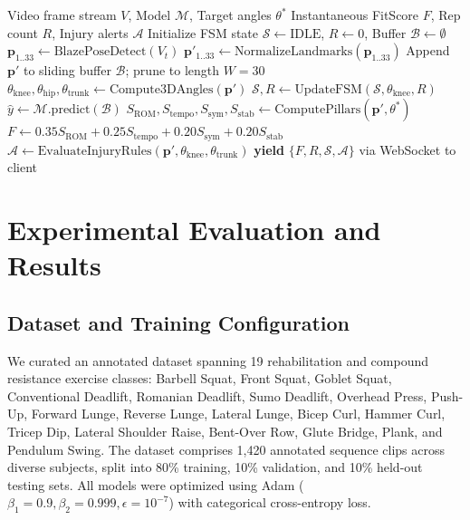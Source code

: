\documentclass[conference]{IEEEtran}
\begin{document}
\begin{algorithm}[!t]
\caption{Real-Time Biomechanical Evaluation and Scoring}
\label{alg:fitscore}
\begin{algorithmic}[1]
\REQUIRE Video frame stream $V$, Model $\mathcal{M}$, Target angles $\theta^*$
\ENSURE Instantaneous FitScore $F$, Rep count $R$, Injury alerts $\mathcal{A}$
\STATE Initialize FSM state $\mathcal{S} \leftarrow \text{IDLE}$, $R \leftarrow 0$, Buffer $\mathcal{B} \leftarrow \emptyset$
    \STATE $\mathbf{p}_{1..33} \leftarrow \text{BlazePoseDetect}(V_t)$
    \STATE $\mathbf{p}'_{1..33} \leftarrow \text{NormalizeLandmarks}(\mathbf{p}_{1..33})$
    \STATE Append $\mathbf{p}'$ to sliding buffer $\mathcal{B}$; prune to length $W=30$
    \STATE $\theta_{\text{knee}}, \theta_{\text{hip}}, \theta_{\text{trunk}} \leftarrow \text{Compute3DAngles}(\mathbf{p}')$
    \STATE $\mathcal{S}, R \leftarrow \text{UpdateFSM}(\mathcal{S}, \theta_{\text{knee}}, R)$
    \STATE $\hat{y} \leftarrow \mathcal{M}.\text{predict}(\mathcal{B})$ 
    \STATE $S_{\text{ROM}}, S_{\text{tempo}}, S_{\text{sym}}, S_{\text{stab}} \leftarrow \text{ComputePillars}(\mathbf{p}', \theta^*)$
    \STATE $F \leftarrow 0.35 S_{\text{ROM}} + 0.25 S_{\text{tempo}} + 0.20 S_{\text{sym}} + 0.20 S_{\text{stab}}$
    \STATE $\mathcal{A} \leftarrow \text{EvaluateInjuryRules}(\mathbf{p}', \theta_{\text{knee}}, \theta_{\text{trunk}})$
    \STATE \textbf{yield} $\{F, R, \mathcal{S}, \mathcal{A}\}$ via WebSocket to client
\ENDWHILE
\end{algorithmic}
\end{algorithm}

\section{Experimental Evaluation and Results}

\subsection{Dataset and Training Configuration}
We curated an annotated dataset spanning 19 rehabilitation and compound resistance exercise classes: Barbell Squat, Front Squat, Goblet Squat, Conventional Deadlift, Romanian Deadlift, Sumo Deadlift, Overhead Press, Push-Up, Forward Lunge, Reverse Lunge, Lateral Lunge, Bicep Curl, Hammer Curl, Tricep Dip, Lateral Shoulder Raise, Bent-Over Row, Glute Bridge, Plank, and Pendulum Swing. The dataset comprises 1,420 annotated sequence clips across diverse subjects, split into 80\% training, 10\% validation, and 10\% held-out testing sets. All models were optimized using Adam ($\beta_1=0.9, \beta_2=0.999, \epsilon=10^{-7}$) \cite{kingma2014adam} with categorical cross-entropy loss.
\end{document}
